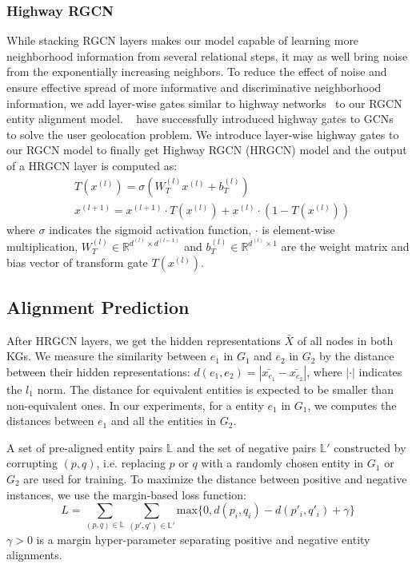 	
	\subsubsection{Highway RGCN}
	\label{section:hgcn}
	While stacking RGCN layers makes our model capable of learning more neighborhood information from several relational steps, it may as well bring noise from the exponentially increasing neighbors. To reduce the effect of noise and ensure effective spread of more informative and discriminative neighborhood information, we add layer-wise gates similar to highway networks~\cite{Srivastava2015Highway} to our RGCN entity alignment model. ~\cite{Rahimi2018Semi} have successfully introduced highway gates to GCNs~\cite{Kipf2016Semi} to solve the user geolocation problem. We introduce layer-wise highway gates to our RGCN model to finally get Highway RGCN (HRGCN) model and the output of a HRGCN layer is computed as:
	\begin{equation}
	\begin{split}
	&T(x^{(l)})=\sigma(W_T^{(l)}x^{(l)}+b_T^{(l)}) \\
	&x^{(l+1)}=x^{(l+1)} \cdot T(x^{(l)})+x^{(l)} \cdot (1-T(x^{(l)}))
	\end{split}
	\end{equation} 
	where $\sigma$ indicates the sigmoid activation function, $\cdot$ is element-wise multiplication, $W_T^{(l)} \in \mathbb{R}^{d^{(l)} \times d^{(l-1)}}$ and $b_T^{(l)} \in \mathbb{R}^{d^{(l)} \times 1}$ are the weight matrix and bias vector of transform gate $T(x^{(l)})$.
	
	\subsection{Alignment Prediction}
	After HRGCN layers, we get the hidden representations $\bar{X}$ of all nodes in both KGs. We measure the similarity between $e_1$ in $G_1$ and $e_2$ in $G_2$ by the distance between their hidden representations: $d(e_1,e_2)=|\bar{x_{e_1}}-\bar{x_{e_2}}|$, where $|\cdot|$ indicates the $l_1$ norm. The distance for equivalent entities is expected to be smaller than non-equivalent ones. In our experiments, for a entity $e_1$ in $G_1$, we computes the distances between $e_1$ and all the entities in $G_2$.
	
	A set of pre-aligned entity pairs $\mathbb{L}$ and the set of negative pairs $\mathbb{L'}$  constructed by corrupting $(p, q)$, i.e. replacing $p$ or $q$ with a randomly chosen entity in $G_1$ or $G_2$ are used for training. To maximize the distance between positive and negative instances, we use the margin-based loss function:
	\begin{equation}
	L=\sum\limits_{(p,q)\in \mathbb{L}}\sum\limits_{(p',q')\in \mathbb{L'}}\mathrm{max}\{0,d(p_i,q_i)-d(p'_i,q'_i)+\gamma\}
	\end{equation} 
	$\gamma > 0$ is a margin hyper-parameter separating positive and negative entity alignments.
	
